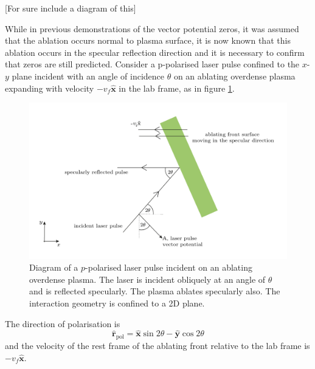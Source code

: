 [For sure include a diagram of this]

While in previous demonstrations of the vector potential zeros, it was assumed that the ablation occurs normal to plasma surface, it is now known that this ablation occurs in the specular reflection direction and it is necessary to confirm that zeros are still predicted. Consider a p-polarised laser pulse confined to the $x$-$y$ plane incident with an angle of incidence $\theta$ on an ablating overdense plasma expanding with velocity $-v_f\hat{\mathbf{x}}$ in the lab frame, as in figure \ref{fig:zvp_ablatingfront}.
\begin{figure}
	\centering
	\includegraphics[width=0.7\linewidth]{figures/zvp/zvp_ablating_front}
	\caption[Diagram of a $p$-polarised laser pulse incident on an ablating overdense plasma.]{Diagram of a $p$-polarised laser pulse incident on an ablating overdense plasma. The laser is incident obliquely at an angle of $\theta$ and is reflected specularly. The plasma ablates specularly also. The interaction geometry is confined to a 2D plane.}
	\label{fig:zvp_ablatingfront}
\end{figure}
The direction of polarisation is
\begin{equation}
	\hat{\mathbf{r}}_\mathrm{pol} = \hat{\mathbf{x}}\sin{2\theta} - \hat{\mathbf{y}}\cos{2\theta}
\end{equation}
and the velocity of the rest frame of the ablating front relative to the lab frame is $-v_f\hat{\mathbf{x}}$.

